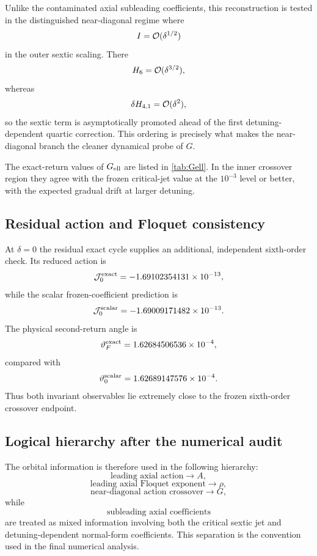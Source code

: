 Unlike the contaminated axial subleading coefficients, this reconstruction is tested in the distinguished near-diagonal regime where
\[
I=\mathcal{O}(\delta^{1/2})
\]
in the outer sextic scaling.  There
\[
H_6=\mathcal{O}(\delta^{3/2}),
\]
whereas
\[
\delta H_{4,1}=\mathcal{O}(\delta^2),
\]
so the sextic term is asymptotically promoted ahead of the first detuning-dependent quartic correction.  This ordering is precisely what makes the near-diagonal branch the cleaner dynamical probe of $G$.

The exact-return values of $G_{\rm ell}$ are listed in \cref{tab:Gell}.  In the inner crossover region they agree with the frozen critical-jet value at the $10^{-3}$ level or better, with the expected gradual drift at larger detuning.

\subsection{Residual action and Floquet consistency}

At $\delta=0$ the residual exact cycle supplies an additional, independent sixth-order check.  Its reduced action is
\[
\mathcal{J}_0^{\rm exact}
=-1.69102354131\times10^{-13},
\]
while the scalar frozen-coefficient prediction is
\[
\mathcal{J}_0^{\rm scalar}
=-1.69009171482\times10^{-13}.
\]
The physical second-return angle is
\[
\vartheta_F^{\rm exact}
=1.62684506536\times10^{-4},
\]
compared with
\[
\vartheta_0^{\rm scalar}
=1.62689147576\times10^{-4}.
\]
Thus both invariant observables lie extremely close to the frozen sixth-order crossover endpoint.

\subsection{Logical hierarchy after the numerical audit}

The orbital information is therefore used in the following hierarchy:
\[
\boxed{
\text{leading axial action}\longrightarrow A,
}
\]
\[
\boxed{
\text{leading axial Floquet exponent}\longrightarrow\rho,
}
\]
\[
\boxed{
\text{near-diagonal action crossover}\longrightarrow G,
}
\]
while
\[
\boxed{
\text{subleading axial coefficients}
}
\]
are treated as mixed information involving both the critical sextic jet and detuning-dependent normal-form coefficients.  This separation is the convention used in the final numerical analysis.
